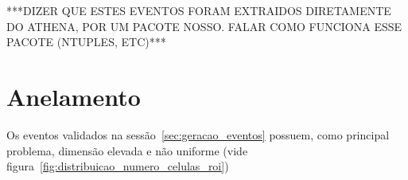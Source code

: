 ***DIZER QUE ESTES EVENTOS FORAM EXTRAIDOS DIRETAMENTE DO ATHENA, POR UM PACOTE NOSSO. FALAR COMO FUNCIONA ESSE PACOTE (NTUPLES, ETC)***

\section{Anelamento}

Os eventos validados na sessão~\ref{sec:geracao_eventos} possuem, como principal problema, dimensão elevada e não uniforme (vide figura~\ref{fig:distribuicao_numero_celulas_roi})

